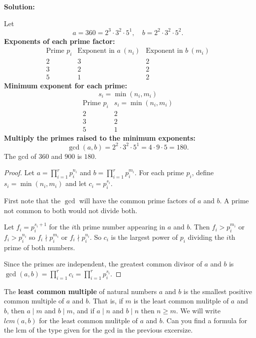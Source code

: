 \documentclass[8pt]{article}
\begin{document}
\textbf{Solution:}

Let 
\[
a = 360 = 2^3 \cdot 3^2 \cdot 5^1, \quad
b = 2^2 \cdot 3^2 \cdot 5^2.
\]
\textbf{Exponents of each prime factor:}
\[
\begin{array}{c|c|c}
\text{Prime } p_i & \text{Exponent in } a \ (n_i) & \text{Exponent in } b \ (m_i) \\
\hline
2 & 3 & 2 \\
3 & 2 & 2 \\
5 & 1 & 2
\end{array}
\]
\textbf{Minimum exponent for each prime:}
\[
s_i = \min(n_i, m_i)
\]
\[
\begin{array}{c|c}
\text{Prime } p_i & s_i = \min(n_i, m_i) \\
\hline
2 & 2 \\
3 & 2 \\
5 & 1
\end{array}
\]
\textbf{Multiply the primes raised to the minimum exponents:}
\[
\gcd(a,b) = 2^2 \cdot 3^2 \cdot 5^1 = 4 \cdot 9 \cdot 5 = 180.
\]
The gcd of $360$ and $900$ is $180$.

\begin{proof}
    Let $a = \prod_{i=1}^r p_i^{n_i}$ and $b = \prod_{i=1}^r p_i^{m_i}$.
    For each prime $p_i$, define $s_i = \min(n_i, m_i)$ and let $c_i = p_i^{s_i}$. 

    First note that the $\gcd$ will have the common prime factors of $a$ and $b$.
    A prime not common to both would not divide both.

    Let $f_i = p_i^{s_i + 1}$ for the $i$th prime number appearing in $a$ and $b$. 
    Then $f_i > p_i^{m_i}$ or $f_i > p_i^{n_i}$ so $f_i \nmid p_i^{m_i}$ or $f_i \nmid p_i^{n_i}$.
    So $c_i$ is the largest power of $p_i$ dividing the $i$th prime of both numbers.

    Since the primes are independent, the greatest common divisor of $a$ and $b$ is 
        $\gcd(a,b) = \prod_{i=1}^r c_i = \prod_{i=1}^r p_i^{s_i}$.
\end{proof}

\begin{tcolorbox}[title=Problem 11, breakable]
    The \textbf{least common multiple} of natural numbers $a$ and $b$
    is the smallest positive common multiple of $a$ and $b$. That is,
    if $m$ is the least common mulitple of $a$ and $b$, then $a \mid m$
    and $b \mid m$, and if $a \mid n$ and $b \mid n$ then $n \ge m$.
    We will write $lcm(a, b)$ for the least common mulitple of $a$ and $b$.
    Can you find a formula for the lcm of the type given for the gcd in 
    the previous excersize.
\end{tcolorbox}
\end{document}
